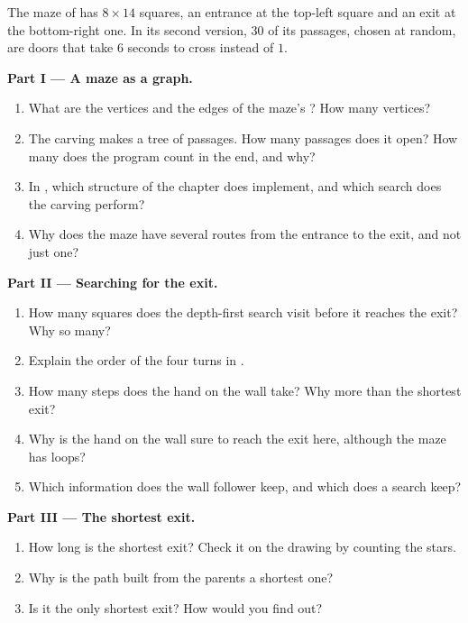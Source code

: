 \begin{problem}\label{pb:g12:graph-algorithms:1}
The maze of  has $8 \times 14$ squares, an entrance at the top-left square and an exit at the
bottom-right one. In its second version, $30$ of its passages, chosen at random, are doors that take $6$ seconds to
cross instead of $1$.

%
\label{lst:g12:graph-algorithms:doors}

%
\label{out:g12:graph-algorithms:doors}

\medskip\noindent\textbf{Part I --- A maze as a graph.}
\begin{enumerate}
  \item What are the vertices and the edges of the maze's ? How many vertices?
  \item The carving makes a tree of passages. How many passages does it open? How many does the program count in the
    end, and why?
  \item In , which structure of the chapter does  implement, and which search does the
    carving perform?
  \item Why does the maze have several routes from the entrance to the exit, and not just one?
\end{enumerate}

\medskip\noindent\textbf{Part II --- Searching for the exit.}
\begin{enumerate}[resume]
  \item How many squares does the depth-first search visit before it reaches the exit? Why so many?
  \item Explain the order of the four turns in .
  \item How many steps does the hand on the wall take? Why more than the shortest exit?
  \item Why is the hand on the wall sure to reach the exit here, although the maze has loops?
  \item Which information does the wall follower keep, and which does a search keep?
\end{enumerate}

\medskip\noindent\textbf{Part III --- The shortest exit.}
\begin{enumerate}[resume]
  \item How long is the shortest exit? Check it on the drawing by counting the stars.
  \item Why is the path built from the parents a shortest one?
  \item Is it the only shortest exit? How would you find out?
\end{enumerate}


\end{problem}
